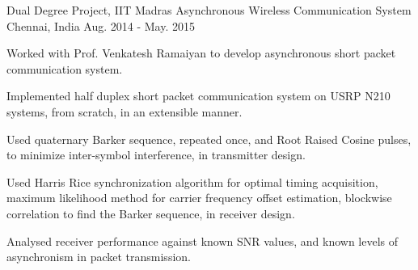\begin{cventries}
	\cventry
	{Dual Degree Project, IIT Madras}
	{Asynchronous Wireless Communication System}
	{Chennai, India}
	{Aug. 2014 - May. 2015}
	{
		\begin{cvitems}
			\item{Worked with Prof. Venkatesh Ramaiyan to develop asynchronous short packet communication system.}
			\item{Implemented half duplex short packet communication system on USRP N210 systems, from scratch, in an extensible manner.}
			\item{Used quaternary Barker sequence, repeated once, and Root Raised Cosine pulses, to minimize inter-symbol interference, in transmitter design.}
			\item{Used Harris Rice synchronization algorithm for optimal timing acquisition, maximum likelihood method for carrier frequency offset estimation, blockwise correlation to find the Barker sequence, in receiver design.}
			\item{Analysed receiver performance against known SNR values, and known levels of asynchronism in packet transmission.}
		\end{cvitems}
	}

\end{cventries}
